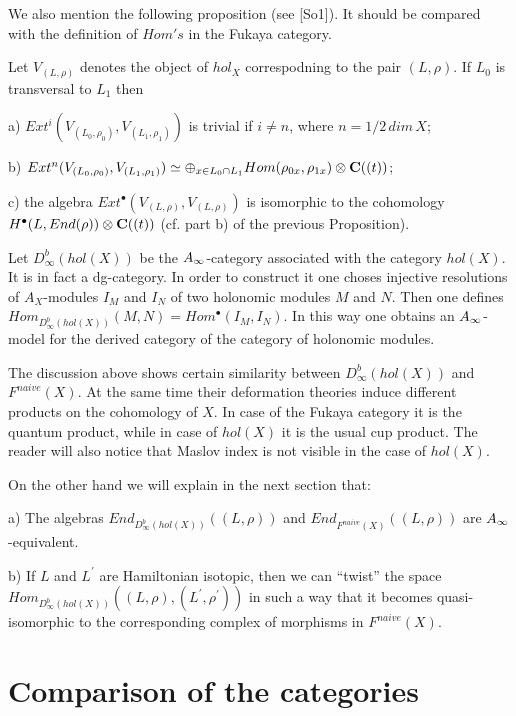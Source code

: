 \documentclass[a4paper,12pt]{article}
\begin{document}
We also mention the following proposition (see [So1]). It should be compared
with the definition of $Hom's$ in the Fukaya category.

\begin{prp} Let $V_{(L,\rho)}$ denotes the object of $hol_X$
correspodning to the pair $(L,\rho)$. If $L_0$ is transversal
to $L_1$ then 

a) $Ext^i(V_{(L_0,\rho_0)},V_{(L_1,\rho_1)})$ is trivial
if $i\ne n$, where $n=1/2\,dim\,X$;


b) $Ext^n(V_{(L_0,\rho_0)},V_{(L_1,\rho_1)})\simeq
\oplus_{x\in L_0\cap L_1}Hom(\rho_{0x},\rho_{1x})\otimes {\bf C}((t))$;

c) the algebra $Ext^{\bullet}(V_{(L,\rho)},V_{(L,\rho)})$
is isomorphic to the cohomology $H^{\bullet}(L,End(\rho))\otimes {\bf C}((t))$
(cf. part b) of the previous Proposition).

\end{prp}

 Let $D^{b}_{\infty}(hol({X}))$ be the $A_{\infty}$-category
 associated with the category $hol({X})$. 
It is in fact a dg-category. In order to construct it one
choses  injective resolutions of $A_X$-modules  $I_M$ and $I_N$  of two 
holonomic modules $M$ and $N$. Then one defines
 $Hom_{D^{b}_{\infty}(hol({X}))}(M,N)=Hom^{\bullet}(I_M,I_N)$.
In this way one obtains an $A_{\infty}$-model for the derived category
of the category of holonomic modules.

The discussion above shows certain similarity between 
$D^{b}_{\infty}(hol(X))$ and $F^{naive}(X)$. At the same time their
deformation theories 
induce different products on the cohomology of $X$. In case of the 
Fukaya category it is the quantum product, while in case of $hol({X})$ it is
the usual cup product. The reader  will also notice that Maslov index is not
visible in the case of $hol(X)$. 



On the other hand we will explain in the next section that:

a) The algebras $End_{D^{b}_{\infty}(hol(X))}((L,\rho))$ 
and  $End_{F^{naive}(X)}((L,\rho))$ are $A_{\infty}$-equivalent.

b) If $L$ and $L^{\prime}$ are Hamiltonian isotopic, then we can
``twist'' the space 
$Hom_{D^{b}_{\infty}(hol(X))}((L,\rho),(L^{\prime},\rho^{\prime}))$ in such a way that it becomes
quasi-isomorphic to the corresponding complex of morphisms in $F^{naive}(X)$.



\section{Comparison of the categories}
 
\end{document}
